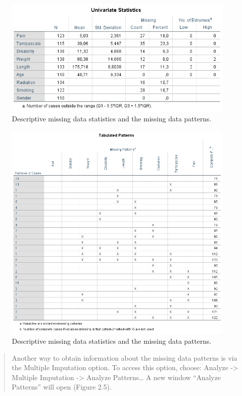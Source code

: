 \documentclass[]{book}
\begin{document}
\begin{figure}

{\centering \includegraphics[width=0.9\linewidth]{images/tab2.1a} 

}

\caption{Descriptive missing data statistics and the missing data patterns.}\label{fig:tab1}
\end{figure}\begin{figure}

{\centering \includegraphics[width=0.9\linewidth]{images/tab2.1b} 

}

\caption{Descriptive missing data statistics and the missing data patterns.}\label{fig:tab1}
\end{figure}

\begin{quote}
Another way to obtain information about the missing data patterns is via
the Multiple Imputation option. To access this option, choose: Analyze
-\textgreater{} Multiple Imputation -\textgreater{} Analyze
Patterns\ldots{} A new window ``Analyze Patterns'' will open (Figure
2.5).
\end{quote}
\end{document}

